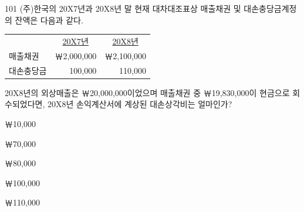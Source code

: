 \begin{question}{101}
(주)한국의 20X7년과 20X8년 말 현재 대차대조표상 매출채권 및 대손충당금계정의 잔액은 다음과 같다.

{\small\centering
\begin{tabular}{lrr}
\hline
 & \multicolumn{1}{c}{\uline{20X7년}} & \multicolumn{1}{c}{\uline{20X8년}} \\
매출채권 & ￦2,000,000 & ￦2,100,000 \\
대손충당금 & 100,000 & 110,000 \\
\hline
\end{tabular}
\par}

20X8년의 외상매출은 ￦20,000,000이었으며 매출채권 중 ￦19,830,000이 현금으로 회수되었다면, 20X8년 손익계산서에 계상된 대손상각비는 얼마인가? \par
\begin{choices}
  \item ￦10,000
  \item ￦70,000
  \item ￦80,000
  \item ￦100,000
  \item ￦110,000
\end{choices}
\end{question}
